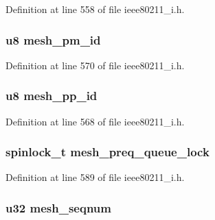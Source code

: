 Definition at line 558 of file ieee80211\-\_\-i.\-h.

\hypertarget{structieee80211__if__mesh_a12e1b42980e196b8395edd3b7b00185a}{
\subsubsection[{mesh\-\_\-pm\-\_\-id}]{\setlength{\rightskip}{0pt plus 5cm}u8 mesh\-\_\-pm\-\_\-id}}\label{structieee80211__if__mesh_a12e1b42980e196b8395edd3b7b00185a}


Definition at line 570 of file ieee80211\-\_\-i.\-h.

\hypertarget{structieee80211__if__mesh_a1dd8e1a94ceedad87851b023b7f53e6c}{
\subsubsection[{mesh\-\_\-pp\-\_\-id}]{\setlength{\rightskip}{0pt plus 5cm}u8 mesh\-\_\-pp\-\_\-id}}\label{structieee80211__if__mesh_a1dd8e1a94ceedad87851b023b7f53e6c}


Definition at line 568 of file ieee80211\-\_\-i.\-h.

\hypertarget{structieee80211__if__mesh_a38a1a735de11766717875f1e40ae6ca7}{
\subsubsection[{mesh\-\_\-preq\-\_\-queue\-\_\-lock}]{\setlength{\rightskip}{0pt plus 5cm}spinlock\-\_\-t mesh\-\_\-preq\-\_\-queue\-\_\-lock}}\label{structieee80211__if__mesh_a38a1a735de11766717875f1e40ae6ca7}


Definition at line 589 of file ieee80211\-\_\-i.\-h.

\hypertarget{structieee80211__if__mesh_aa5e6ec48251f030a59d356caac4db5ec}{
\subsubsection[{mesh\-\_\-seqnum}]{\setlength{\rightskip}{0pt plus 5cm}u32 mesh\-\_\-seqnum}}\label{structieee80211__if__mesh_aa5e6ec48251f030a59d356caac4db5ec}


